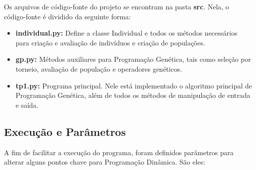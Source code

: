 \documentclass[12pt]{article}
\begin{document}
Os arquivos de código-fonte do projeto se encontram na pasta \textbf{src}. Nela, o
código-fonte é dividido da seguinte forma:

\begin{itemize}
 \item \textbf{individual.py:} Define a classe Individual e todos os métodos necessários
 para criação e avaliação de indivíduos e criação de populações.
 
 \item \textbf{gp.py:} Métodos auxiliares para Programação Genética, tais como seleção
 por torneio, avaliação de população e operadores genéticos.
 
 \item \textbf{tp1.py:} Programa principal. Nele está implementado o algoritmo principal
 de Programação Genética, além de todos os métodos de manipulação de entrada e saída.
\end{itemize}

\subsection{Execução e Parâmetros}

A fim de facilitar a execução do programa, foram definidos parâmetros para alterar 
alguns pontos chave para Programação Dinâmica. São eles:
\end{document}

